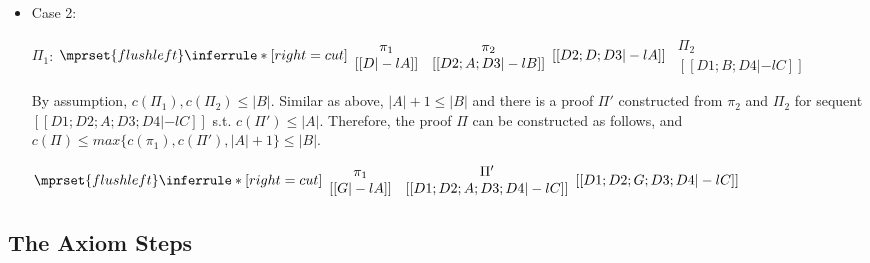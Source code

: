 \begin{itemize}
\item Case 2:
      \begin{center}
        \scriptsize
        $\Pi_1$:
        \begin{math}
          $$\mprset{flushleft}
          \inferrule* [right={\tiny cut}] {
            {
              \begin{array}{cc}
                \pi_1 & \pi_2 \\
                {[[D |-l A]]} & {[[D2; A; D3 |-l B]]}
              \end{array}
            }
          }{[[D2; D; D3 |-l A]]}
        \end{math}
        \qquad\qquad
        \begin{math}
          \begin{array}{c}
            \Pi_2 \\
            {[[D1; B; D4 |-l C]]}
          \end{array}
        \end{math}
      \end{center}
      By assumption, $c(\Pi_1),c(\Pi_2)\leq |B|$. Similar as above,
      $|A|+1\leq |B|$ and there is a proof $\Pi'$ constructed from $\pi_2$ 
      and $\Pi_2$ for sequent $[[D1; D2; A; D3; D4 |-l C]]$ s.t.
      $c(\Pi')\leq|A|$. Therefore, the proof $\Pi$ can be constructed as
      follows, and $c(\Pi)\leq max\{c(\pi_1),c(\Pi'),|A|+1\}\leq |B|$.
      \begin{center}
        \scriptsize
        \begin{math}
          $$\mprset{flushleft}
          \inferrule* [right={\tiny cut}] {
            {
              \begin{array}{cc}
                \pi_1 & \Pi' \\
                {[[G |-l A]]} & {[[D1; D2; A; D3; D4 |-l C]]}
              \end{array}
            }
          }{[[D1; D2; G; D3; D4 |-l C]]}
        \end{math}
      \end{center}

\end{itemize}



\subsection{The Axiom Steps}

